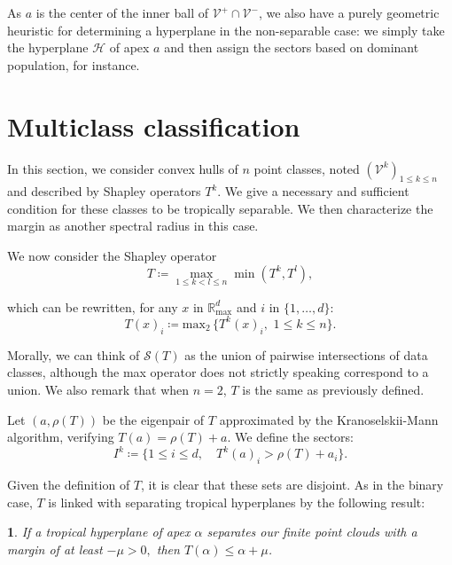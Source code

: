 \documentclass[oneside,UKenglish,a4paper]{amsart}
\numberwithin{equation}{section}
\numberwithin{figure}{section}
\theoremstyle{plain}
\theoremstyle{definition}
\theoremstyle{plain}
\theoremstyle{remark}
\theoremstyle{plain}
\newtheorem{lem}[thm]{\protect\lemmaname}
\theoremstyle{definition}
\theoremstyle{definition}
\providecommand{\lemmaname}{Lemma}
\begin{document}
As $a$ is the center of the inner ball of $\mathcal{V}^{+}\cap\mathcal{V}^{-}$,
we also have a purely geometric heuristic for determining a
hyperplane in the non-separable case: we simply take the hyperplane
$\mathcal{H}$ of apex $a$ and then assign the sectors based on dominant
population, for instance.


\section{Multiclass classification}\label{section:MultiClass}

In this section, we consider convex hulls of $n$
point classes, noted $(\mathcal{V}^{k})_{1\le k\le n}$ and described by Shapley operators
$T^{k}$. We give a necessary and sufficient condition for these classes to be tropically separable. We then characterize the margin as another spectral radius in this case.

We now consider the Shapley operator
\[
T\coloneqq\max_{1\le k<l\le n}\min(T^{k}, T^{l}),
\]

which can be rewritten, for any $x$ in $\mathbb{R}_{\max}^d$ and $i$ in $\{1,\ldots, d\}$:
\begin{equation}\label{eq:Max2Form}
T(x)_i\coloneqq\text{max}_2\, \{T^k(x)_i, \,\, 1\le k\le n\}.
\end{equation}


Morally, we can think of $\mathcal{S}(T)$ as the union of pairwise intersections of data classes, although the max operator does not strictly speaking correspond to a union. We also remark that when $n=2$, $T$ is the same as previously
defined.

Let $(a,\rho(T))$ be the eigenpair of $T$ approximated by the Kranoselskii-Mann
algorithm, verifying $T(a)=\rho(T)+a$. We define the sectors:
\begin{equation}
I^{k}\coloneqq\{1\le i\le d,\quad T^{k}(a)_{i}>\rho(T)+a_{i}\}.\label{eq:SectorAssign}
\end{equation}

Given the definition of $T$, it is clear that these sets are disjoint. As in the binary case, $T$ is linked with separating tropical hyperplanes by the following result: 

\begin{lem}
\label{lemma:LinkSepShapleyMulti}
    If a tropical hyperplane of apex $\alpha$ separates our finite point clouds with a margin of at least $-\mu > 0,$ then $T(\alpha) \le \alpha  + \mu$.
\end{lem}
\end{document}
